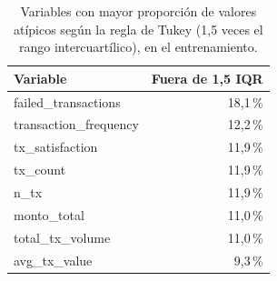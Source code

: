 \begin{table}[htbp]
\caption{Variables con mayor proporción de valores atípicos según la regla de Tukey (1,5 veces el rango intercuartílico), en el entrenamiento.}\label{tab:atipicos}
\scriptsize\setlength{\tabcolsep}{2pt}
\begin{tabular}{lr}
\toprule
\textbf{Variable} & \textbf{Fuera de 1,5 IQR} \\
\midrule
failed\_transactions & 18,1\,\% \\
transaction\_frequency & 12,2\,\% \\
tx\_satisfaction & 11,9\,\% \\
tx\_count & 11,9\,\% \\
n\_tx & 11,9\,\% \\
monto\_total & 11,0\,\% \\
total\_tx\_volume & 11,0\,\% \\
avg\_tx\_value & 9,3\,\% \\
\bottomrule
\end{tabular}
\end{table}
